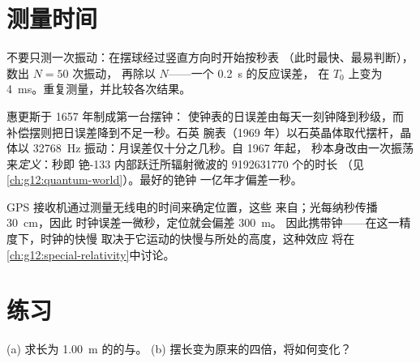 \section{测量时间}

\begin{method}[周期的测定]\label{met:g12:oscillators-and-time:timing}
不要只测一次振动：在摆球经过竖直方向时开始按秒表
（此时最快、最易判断），数出 $N = 50$ 次振动，
再除以 $N$——一个 \qty{0.2}{s} 的反应误差，
在 $T_0$ 上变为 \qty{4}{ms}。重复测量，并比较各次结果。
\end{method}

\begin{example}[三个世纪的滴答]\label{ex:g12:oscillators-and-time:clocks}
惠更斯于 \num{1657} 年制成第一台摆钟：
使钟表的日误差由每天一刻钟降到秒级，而
补偿摆则把日误差降到不足一秒。石英
腕表（\num{1969} 年）以石英晶体取代摆杆，晶体以
\qty{32768}{Hz} 振动：月误差仅十分之几秒。自 \num{1967} 年起，
秒本身改由一次振荡来\emph{定义}：秒即
铯-133 内部跃迁所辐射微波的 \num{9192631770} 个的时长
（见\cref{ch:g12:quantum-world}）。最好的铯钟
一亿年才偏差一秒。
\end{example}

\begin{remark}[为何追求纳秒精度]\label{rem:g12:oscillators-and-time:gps}
GPS 接收机通过测量无线电的时间来确定位置，这些
来自；光每纳秒传播 \qty{30}{cm}，因此
时钟误差一微秒，定位就会偏差 \qty{300}{m}。
因此携带钟——在这一精度下，时钟的快慢
取决于它运动的快慢与所处的高度，这种效应
将在\cref{ch:g12:special-relativity}中讨论。
\end{remark}

\section{练习}

\begin{exercise}[$\star$]\label{exo:g12:oscillators-and-time:1}
(a) 求长为 \qty{1.00}{m} 的的与。
(b) 摆长变为原来的四倍，将如何变化？
\end{exercise}

